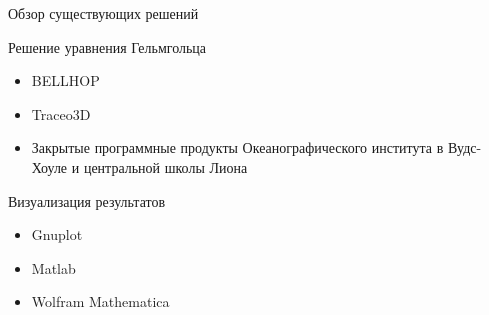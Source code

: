 \documentclass[10pt, unicode]{beamer}
\newif\ifPS
\begin{document}
    \begin{frame}[fragile]{Обзор существующих решений}
        \begin{block}{Решение уравнения Гельмгольца}
            \begin{itemize}
                \item BELLHOP
                \item Traceo3D
                \item Закрытые программные продукты Океанографического института в Вудс-Хоуле и центральной школы Лиона
            \end{itemize}
        \end{block}
        \begin{block}{Визуализация результатов}
            \begin{itemize}
                \item Gnuplot
                \item Matlab
                \item Wolfram Mathematica
            \end{itemize}
        \end{block}
    \end{frame}

    \begin{frame}
        \thispagestyle{empty}
        \addtocounter{framenumber}{-1}
        \ifPS
            \centerline{\Huge Спасибо за внимание}
        \fi
    \end{frame}
    
\end{document}
